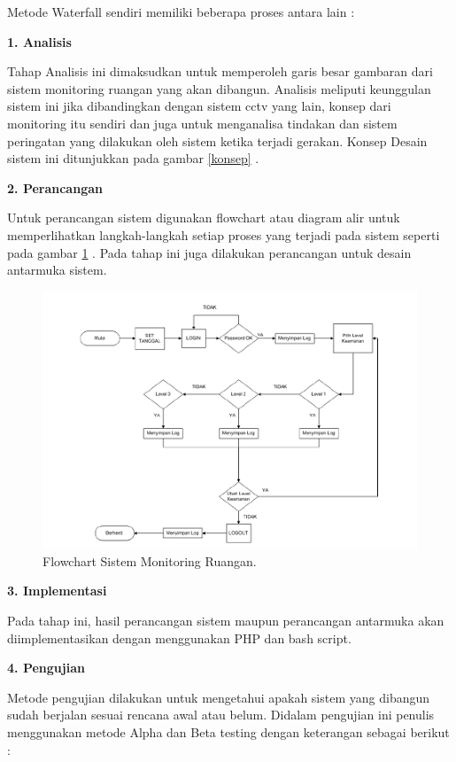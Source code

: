 \documentclass{jtetiproposalskripsi}
\begin{document}
Metode Waterfall sendiri memiliki beberapa proses antara lain :

\textbf{1. Analisis}

Tahap Analisis ini dimaksudkan untuk memperoleh garis besar gambaran dari sistem monitoring ruangan yang akan dibangun. Analisis meliputi keunggulan sistem ini jika dibandingkan dengan sistem cctv yang lain, konsep dari monitoring itu sendiri dan juga untuk menganalisa tindakan dan sistem peringatan yang dilakukan oleh sistem ketika terjadi gerakan. Konsep Desain sistem ini ditunjukkan pada gambar \ref{konsep} .

\textbf{2. Perancangan}

Untuk perancangan sistem digunakan flowchart atau diagram alir untuk memperlihatkan langkah-langkah setiap proses yang terjadi pada sistem seperti pada gambar \ref{flow} . Pada tahap ini juga dilakukan perancangan untuk desain antarmuka sistem.

\begin{figure}[ht!]
  \centering
    \includegraphics{gambar/flow}
    \caption{Flowchart Sistem Monitoring Ruangan.}
    \label{flow}
\end{figure}

\textbf{3. Implementasi}

Pada tahap ini, hasil perancangan sistem maupun perancangan antarmuka akan diimplementasikan dengan menggunakan PHP dan bash script.

\textbf{4. Pengujian}

Metode pengujian dilakukan untuk mengetahui apakah sistem yang dibangun sudah berjalan sesuai rencana awal atau belum. Didalam pengujian ini penulis menggunakan metode Alpha dan Beta testing dengan keterangan sebagai berikut :
\end{document}
